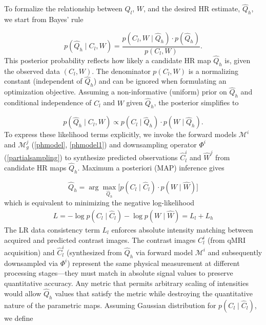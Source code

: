 \documentclass[journal,twoside,web]{ieeecolor}
\begin{document}
To formalize the relationship between  $Q_l$, \(W\), and the desired HR estimate, $\hat{Q}_h$, we start from Bayes' rule

\begin{equation}
    p(\hat{Q}_h \mid C_l,W)  
    = \frac{p(C_l, W \mid \hat{Q}_h) \cdot p(\hat{Q}_h)}{p(C_l, W)}.
    \label{bayes_rule}
\end{equation}
This posterior probability reflects how likely a candidate HR map $\hat{Q}_h$ is, given the observed data $(C_l, W)$. The denominator \( p(C_l, W) \) is a normalizing constant (independent of $\hat{Q}_h$) and can be ignored when formulating an optimization objective. Assuming a non-informative (uniform) prior on $\hat{Q}_h$ and conditional independence of $C_l$ and $W$ given $\hat{Q}_h$, the posterior simplifies to


\begin{equation}
  p(\hat{Q}_h \mid C_l, W)  \propto 
  p(C_l \mid \hat{Q}_h) \cdot p(W \mid \hat{Q}_h).
\label{eq:likelihood}
\end{equation}
To express these likelihood terms explicitly, we invoke the forward models $\mathcal{M}^i$ and $\mathcal{M}_g^j$ (\eqref{phmodel}, \eqref{phmodel1}) and downsampling operator $\Phi^i$ (\eqref{partialsampling}) to synthesize predicted observations $\hat{C}_l^i$ and $\hat{W}^j$ from candidate HR maps $\hat{Q}_h$. Maximum a posteriori (MAP) inference gives

\begin{equation}
\hat{Q}_h = \arg\max_{\hat{Q}_h} \big[ p(C_l \mid \hat{C}_l)    \cdot p(W \mid \hat{W})  \big] 
\label{1}
\end{equation}
which is equivalent to minimizing the negative log-likelihood
{\small
\begin{align}
L =  - \log p(C_l \mid \hat{C}_l) -\log p(W \mid \hat{W}) = L_l + L_h
\label{eq:neg_log_likelihood}
\end{align}
}
The LR data consistency term $L_l$ enforces absolute intensity matching between acquired and predicted contrast images. The contrast images $C_l^i$ (from qMRI acquisition) and $\hat{C}_l^i$ (synthesized from $\hat{Q}_h$ via forward model $\mathcal{M}^i$ and subsequently downsampled via $\Phi^i$) represent the same physical measurement at different processing stages—they must match in absolute signal values to preserve quantitative accuracy. Any metric that permits arbitrary scaling of intensities would allow $\hat{Q}_h$ values that satisfy the metric while destroying the quantitative nature of the parametric maps. Assuming Gaussian distribution for $p(C_l \mid \hat{C}_l)$, we define
\end{document}
